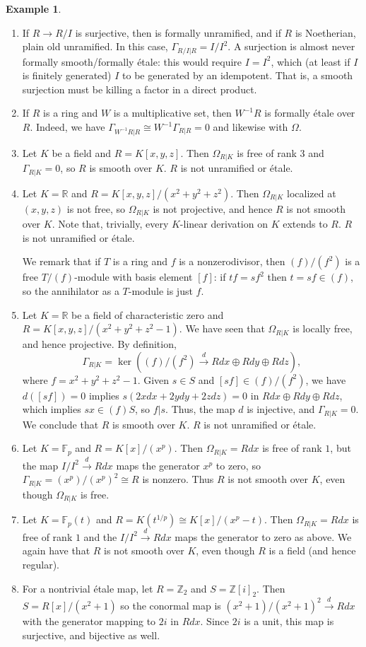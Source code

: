 \documentclass{amsart}[12pt]
\def\ker{\operatorname{ker}}
\newcommand{\R}{{\mathbb{R}}}
\newcommand{\F}{\mathbb{F}}
\newcommand{\Z}{\mathbb{Z}}
\numberwithin{equation}{section}
\theoremstyle{plain} %
\theoremstyle{definition}
\newtheorem{ex}[equation]{Example}
\theoremstyle{remark}
\newcommand{\xra}[1]{\xrightarrow{#1}}
\begin{document}
\begin{ex}
\begin{enumerate}
\item If $R\to R/I$ is surjective, then is formally unramified, and if $R$ is Noetherian, plain old unramified. In this case, $\Gamma_{R/I|R} = I/I^2$. A surjection is almost never formally smooth/formally \'etale: this would require $I=I^2$, which (at least if $I$ is finitely generated) $I$ to be generated by an idempotent. That is, a smooth surjection must be killing a factor in a direct product.
\item If $R$ is a ring and $W$ is a multiplicative set, then $W^{-1}R$ is formally \'etale over $R$. Indeed, we have $\Gamma_{W^{-1}R|R} \cong W^{-1}\Gamma_{R|R} = 0$ and likewise with $\Omega$.
\item Let $K$ be a field and $R=K[x,y,z]$. Then $\Omega_{R|K}$ is free of rank 3 and $\Gamma_{R|K}=0$, so $R$ is smooth over $K$. $R$ is not unramified or \'etale.
\item Let $K=\R$ and $R=K[x,y,z]/(x^2+y^2+z^2)$. Then $\Omega_{R|K}$ localized at $(x,y,z)$ is not free, so $\Omega_{R|K}$ is not projective, and hence $R$ is not smooth over $K$. 
Note that, trivially, every $K$-linear derivation on $K$ extends to $R$. 
$R$ is not unramified or \'etale.

We remark that if $T$ is a ring and $f$ is a nonzerodivisor, then $(f)/(f^2)$ is a free $T/(f)$-module with basis element $[f]$: if $tf=sf^2$ then $t=sf\in (f)$, so the annihilator as a $T$-module is just $f$.

\item Let $K=\R$ be a field of characteristic zero and $R=K[x,y,z]/(x^2+y^2+z^2-1)$. We have seen that $\Omega_{R|K}$ is locally free, and hence projective. By definition, 
\[ \Gamma_{R|K} = \ker \left( (f)/(f^2)\xra{d} R dx \oplus R dy \oplus R dz \right),\] where $f=x^2+y^2+z^2-1$.
 Given $s\in S$ and $[sf]\in (f)/(f^2)$, we have $d([sf])=0$ implies $s (2 x dx + 2 y dy + 2 z dz) =0$ in $R dx \oplus R dy \oplus R dz$, which implies $s x \in (f) S$, so $f|s$. Thus, the map $d$ is injective, and $\Gamma_{R|K}=0$. We conclude that $R$ is smooth over $K$. $R$ is not unramified or \'etale.
\item Let $K=\F_p$ and $R=K[x]/(x^p)$. Then $\Omega_{R|K}=R dx$ is free of rank $1$, but the map $I/I^2 \xra{d} R dx$ maps the generator $x^p$ to zero, so $\Gamma_{R|K}=(x^p)/(x^p)^2 \cong R$ is nonzero. Thus $R$ is not smooth over $K$, even though $\Omega_{R|K}$ is free.
\item Let $K=\F_p(t)$ and $R=K(t^{1/p})\cong K[x]/(x^p-t)$. Then $\Omega_{R|K}= R dx$ is free of rank $1$ and the $I/I^2 \xra{d} R dx$ maps the generator to zero as above. We again have that $R$ is not smooth over $K$, even though $R$ is a field (and hence regular).
\item For a nontrivial \'etale map, let $R=\Z_2$ and $S=\Z[i]_2$. Then $S=R[x]/(x^2+1)$ so the conormal map is $ (x^2+1)/(x^2+1)^2 \xra{d} R dx$
with the generator mapping to $2i$ in $R dx$. Since $2i$ is a unit, this map is surjective, and bijective as well.
\end{enumerate}
\end{ex}
\end{document}
